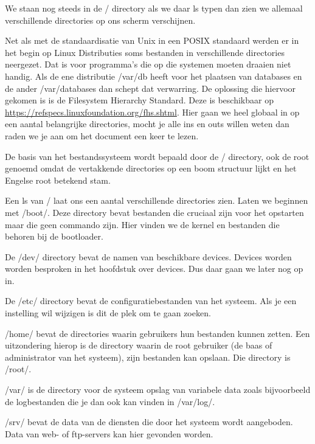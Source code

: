We staan nog steeds in de / directory als we daar ls typen dan zien we allemaal verschillende directories op ons scherm
verschijnen.

Net als met de standaardisatie van Unix in een POSIX standaard werden er in het begin op Linux Distributies soms
bestanden in verschillende directories neergezet. Dat is voor programma's die op die systemen moeten draaien niet
handig. Als de ene distributie /var/db heeft voor het plaatsen van databases en de ander /var/databases dan schept dat
verwarring. De oplossing die hiervoor gekomen is is de Filesystem Hierarchy Standard. Deze is beschikbaar op
\url{https://refspecs.linuxfoundation.org/fhs.shtml}. Hier gaan we heel globaal in op een aantal belangrijke
directories, mocht je alle ins en outs willen weten dan raden we je aan om het document een keer te lezen.

De basis van het bestandssysteem wordt bepaald door de / directory, ook de root genoemd omdat de vertakkende directories
op een boom structuur lijkt en het Engelse root betekend stam.

Een ls van / laat ons een aantal verschillende directories zien. Laten we beginnen met /boot/. Deze directory bevat
bestanden die cruciaal zijn voor het opstarten maar die geen commando zijn. Hier vinden we de kernel en bestanden die
behoren bij de bootloader.

De /dev/ directory bevat de namen van beschikbare devices. Devices worden worden besproken in het hoofdstuk over
devices. Dus daar gaan we later nog op in.

De /etc/ directory bevat de configuratiebestanden van het systeem. Als je een instelling wil wijzigen is dit de plek om
te gaan zoeken.

/home/ bevat de directories waarin gebruikers hun bestanden kunnen zetten. Een uitzondering hierop is de directory
waarin de root gebruiker (de baas of administrator van het systeem), zijn bestanden kan opslaan. Die directory is
/root/.

/var/ is de directory voor de systeem opslag van variabele data zoals bijvoorbeeld de logbestanden die je dan ook kan
vinden in /var/log/.

/srv/ bevat de data van de diensten die door het systeem wordt aangeboden. Data van web- of
ftp-servers kan hier gevonden worden.

